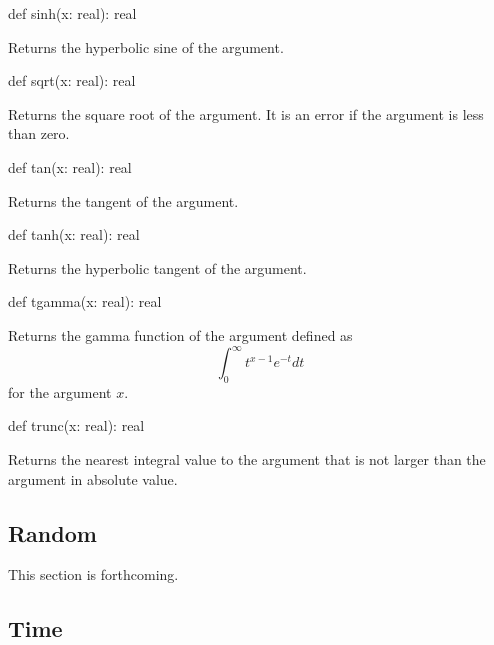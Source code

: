 \begin{protohead}
def sinh(x: real): real
\end{protohead}
\begin{protobody}
Returns the hyperbolic sine of the argument.
\end{protobody}

\begin{protohead}
def sqrt(x: real): real
\end{protohead}
\begin{protobody}
Returns the square root of the argument.  It is an error if the
argument is less than zero.
\end{protobody}

\begin{protohead}
def tan(x: real): real
\end{protohead}
\begin{protobody}
Returns the tangent of the argument.
\end{protobody}

\begin{protohead}
def tanh(x: real): real
\end{protohead}
\begin{protobody}
Returns the hyperbolic tangent of the argument.
\end{protobody}

\begin{protohead}
def tgamma(x: real): real
\end{protohead}
\begin{protobody}
Returns the gamma function of the argument defined as
$$\int_0^\infty t^{x-1} e^{-t} dt$$
for the argument $x$.
\end{protobody}

\begin{protohead}
def trunc(x: real): real
\end{protohead}
\begin{protobody}
Returns the nearest integral value to the argument that is not larger
than the argument in absolute value.
\end{protobody}

\subsection{Random}
\label{Random}

This section is forthcoming.

\subsection{Time}
\label{Time}

